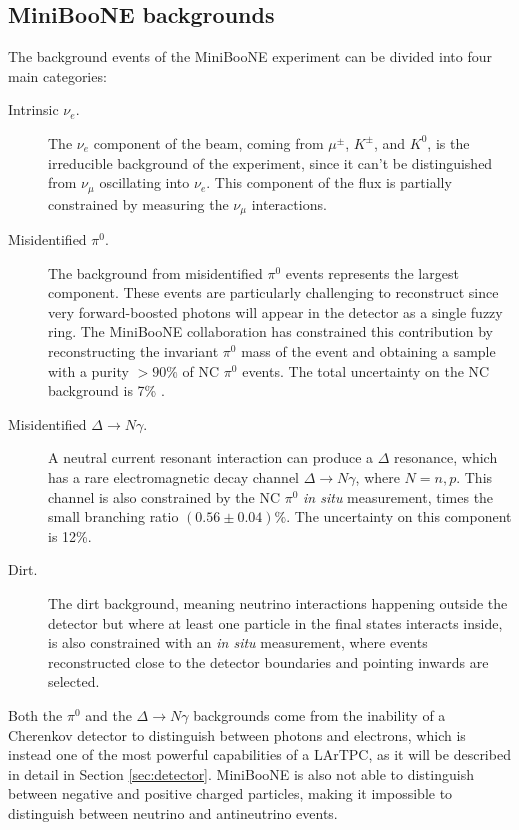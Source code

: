 \subsection*{MiniBooNE backgrounds}
The background events of the MiniBooNE experiment can be divided into four main categories:
\begin{description}
    \item[Intrinsic $\nu_e$.] The $\nu_e$ component of the beam, coming from $\mu^{\pm}$, $K^{\pm}$, and $K^0$, is the irreducible background of the experiment, since it can't be distinguished from $\nu_{\mu}$ oscillating into $\nu_{e}$. This component of the flux is partially constrained by measuring the $\nu_{\mu}$ interactions.
    \item[Misidentified $\pi^0$.] The background from misidentified $\pi^0$ events represents the largest component. These events are particularly challenging to reconstruct since very forward-boosted photons will appear in the detector as a single fuzzy ring. The MiniBooNE collaboration has constrained this contribution by reconstructing the invariant $\pi^0$ mass of the event and obtaining a sample with a purity $>90\%$ of NC $\pi^0$ events. The total uncertainty on the NC background is 7\% \cite{Karagiorgi:2010zz}.
    \item[Misidentified $\Delta\rightarrow N\gamma$.] A neutral current resonant interaction can produce a $\Delta$ resonance, which has a rare electromagnetic decay channel $\Delta\rightarrow N\gamma$, where $N=n,p$. This channel is also constrained by the NC $\pi^0$ \emph{in situ} measurement, times the small branching ratio  $(0.56\pm0.04)\%$. The uncertainty on this component is 12\%.
    \item[Dirt.] The dirt background, meaning neutrino interactions happening outside the detector but where at least one particle in the final states interacts inside, is also constrained with an \emph{in situ} measurement, where events reconstructed close to the detector boundaries and pointing inwards are selected. 
\end{description}

Both the $\pi^0$ and the $\Delta\to N\gamma$ backgrounds come from the inability of a Cherenkov detector to distinguish between photons and electrons, which is instead one of the most powerful capabilities of a LArTPC, as it will be described in detail in Section \ref{sec:detector}. MiniBooNE is also not able to distinguish between negative and positive charged particles, making it impossible to distinguish between neutrino and antineutrino events.


